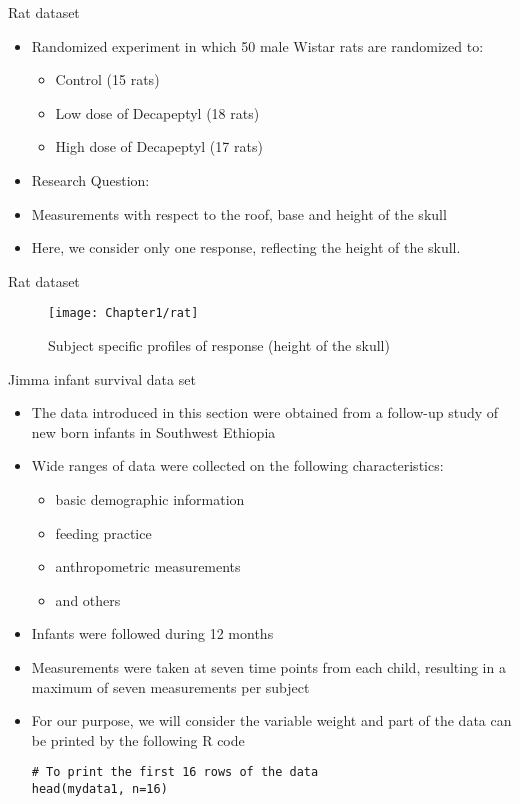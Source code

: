 \documentclass{beamer}
\begin{document}
\begin{frame}{Rat dataset}
\begin{itemize}
\item Randomized experiment in which 50 male Wistar rats are randomized to:
\begin{itemize}
	\item Control (15 rats)
	\item Low dose of Decapeptyl (18 rats)
	\item High dose of Decapeptyl (17 rats)
\end{itemize}
\item Research Question: \color{red}{How does craniofacial growth depend on
	testosteron production?}
\item Measurements with respect to the roof, base and height of the skull
\item Here, we consider only one response, reflecting the height of the skull.
\end{itemize}
\end{frame}

\begin{frame}{Rat dataset}
\begin{figure}[h!]
	\centering
	\texttt{[image: Chapter1/rat]}
	\caption{Subject specific profiles of response (height of the skull)}
\end{figure}
\end{frame}


\begin{frame}[fragile]{Jimma infant survival data set}
\begin{itemize}
	\item The data introduced in this section were obtained from a follow-up study of new born infants in Southwest Ethiopia
	\item Wide ranges of data were collected on the following characteristics:
	\begin{itemize}
		\item basic demographic information
		\item feeding practice
		\item anthropometric measurements
		\item and others
	\end{itemize}
\item Infants were followed during 12 months
\item Measurements were taken at seven time points from each child, resulting in a maximum of seven measurements per subject
\item For our purpose, we will consider the variable weight and part of the data can be printed by the following R code
\begin{verbatim}
# To print the first 16 rows of the data
head(mydata1, n=16)
\end{verbatim}
\end{itemize}
\end{frame}
\end{document}
